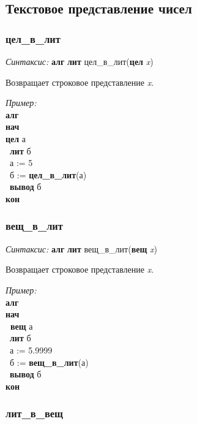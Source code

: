 \documentclass[12pt,a4paper]{article}
\newcommand{\otstup}{\textperiodcentered\ }
\begin{document}
\subsection{Текстовое представление чисел}
\label{text2num}

\subsubsection{цел\_в\_лит}

\emph{Синтаксис:} \textbf{алг} \textbf{лит} цел\_в\_лит(\textbf{цел} \emph{x})


      

        Возвращает строковое представление \emph{x}.
      
  
\emph{Пример:}
\sffamily
~\\\textbf{алг 
~\\нач
~\\цел} а
~\\\otstup \textbf{лит} б
~\\\otstup а := 5
~\\\otstup  б := \textbf{цел\_в\_лит}(а)
~\\\otstup \textbf{вывод} б
~\\\textbf{кон}



\normalfont
\subsubsection{вещ\_в\_лит}

\emph{Синтаксис:} \textbf{алг} \textbf{лит} вещ\_в\_лит(\textbf{вещ} \emph{x})


     

        Возвращает строковое представление \emph{x}.
      
\emph{Пример:}  
\sffamily
~\\\textbf{алг 
~\\нач
~\\\otstup вещ} а
~\\\otstup \textbf{лит} б
~\\\otstup а := 5.9999
~\\\otstup б := \textbf{вещ\_в\_лит}(а)
~\\\otstup \textbf{вывод} б
~\\\textbf{кон}



\normalfont
\subsubsection{лит\_в\_вещ}
\end{document}
